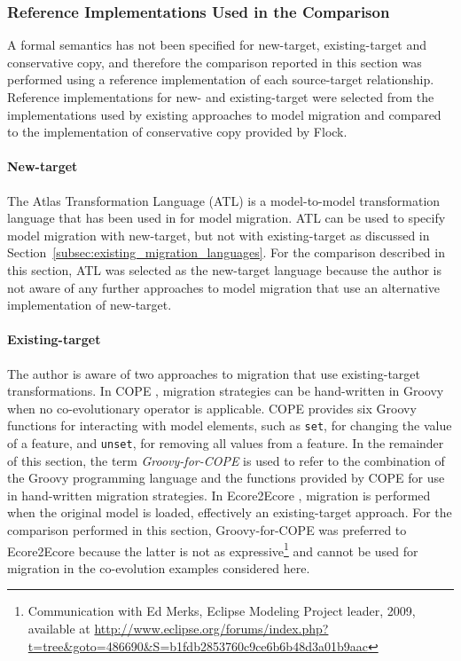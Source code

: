 \subsubsection{Reference Implementations Used in the Comparison}
A formal semantics has not been specified for new-target, existing-target and conservative copy, and therefore the comparison reported in this section was performed using a reference implementation of each source-target relationship. Reference implementations for new- and existing-target were selected from the implementations used by existing approaches to model migration and compared to the implementation of conservative copy provided by Flock.

\paragraph{New-target} The Atlas Transformation Language (ATL) is a model-to-model transformation language that has been used in \cite{cicchetti08automating,garces09managing} for model migration. ATL can be used to specify model migration with new-target, but not with existing-target as discussed in Section~\ref{subsec:existing_migration_languages}. For the comparison described in this section, ATL was selected as the new-target language because the author is not aware of any further approaches to model migration that use an alternative implementation of new-target.

\paragraph{Existing-target} The author is aware of two approaches to migration that use existing-target transformations. In COPE \cite{herrmannsdoerfer09cope}, migration strategies can be hand-written in Groovy when no co-evolutionary operator is applicable. COPE provides six Groovy functions for interacting with model elements, such as \texttt{set}, for changing the value of a feature, and \texttt{unset}, for removing all values from a feature. In the remainder of this section, the term \emph{Groovy-for-COPE} is used to refer to the combination of the Groovy programming language and the functions provided by COPE for use in hand-written migration strategies. In Ecore2Ecore \cite{hussey06advanced}, migration is performed when the original model is loaded, effectively an existing-target approach. For the comparison performed in this section, Groovy-for-COPE was preferred to Ecore2Ecore because the latter is not as expressive\footnote{Communication with Ed Merks, Eclipse Modeling Project leader, 2009, available at \url{http://www.eclipse.org/forums/index.php?t=tree&goto=486690&S=b1fdb2853760c9ce6b6b48d3a01b9aac}} and cannot be used for migration in the co-evolution examples considered here.

